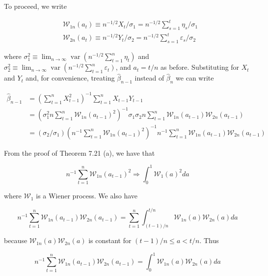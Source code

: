 \documentclass[10pt]{article}
\begin{document}
To proceed, we write

$$
\begin{aligned}
& \mathcal{W}_{1 n}\left(a_{t}\right) \equiv n^{-1 / 2} X_{t} / \sigma_{1}=n^{-1 / 2} \sum_{s=1}^{t} \eta_{s} / \sigma_{1} \\
& \mathcal{W}_{2 n}\left(a_{t}\right) \equiv n^{-1 / 2} Y_{t} / \sigma_{2}=n^{-1 / 2} \sum_{s=1}^{t} \varepsilon_{s} / \sigma_{2}
\end{aligned}
$$

where $\sigma_{1}^{2} \equiv \lim _{n \rightarrow \infty} \operatorname{var}\left(n^{-1 / 2} \sum_{t=1}^{n} \eta_{t}\right)$ and $\sigma_{2}^{2} \equiv \lim _{n \rightarrow \infty} \operatorname{var}\left(n^{-1 / 2} \sum_{t=1}^{n}\right. \left.\varepsilon_{t}\right)$, and $a_{t}=t / n$ as before. Substituting for $X_{t}$ and $Y_{t}$ and, for convenience, treating $\hat{\beta}_{n-1}$ instead of $\hat{\beta}_{n}$ we can write

$$
\begin{aligned}
\hat{\beta}_{n-1} & =\left(\sum_{t=1}^{n} X_{t-1}^{2}\right)^{-1} \sum_{t=1}^{n} X_{t-1} Y_{t-1} \\
& =\left(\sigma_{1}^{2} n \sum_{t=1}^{n} \mathcal{W}_{1 n}\left(a_{t-1}\right)^{2}\right)^{-1} \sigma_{1} \sigma_{2} n \sum_{t=1}^{n} \mathcal{W}_{1 n}\left(a_{t-1}\right) \mathcal{W}_{2 n}\left(a_{t-1}\right) \\
& =\left(\sigma_{2} / \sigma_{1}\right)\left(n^{-1} \sum_{t=1}^{n} \mathcal{W}_{1 n}\left(a_{t-1}\right)^{2}\right)^{-1} n^{-1} \sum_{t=1}^{n} \mathcal{W}_{1 n}\left(a_{t-1}\right) \mathcal{W}_{2 n}\left(a_{t-1}\right)
\end{aligned}
$$

From the proof of Theorem 7.21 (a), we have that

$$
n^{-1} \sum_{t=1}^{n} \mathcal{W}_{1 n}\left(a_{t-1}\right)^{2} \Rightarrow \int_{0}^{1} \mathcal{W}_{1}(a)^{2} d a
$$

where $\mathcal{W}_{1}$ is a Wiener process. We also have

$$
n^{-1} \sum_{t=1}^{n} \mathcal{W}_{1 n}\left(a_{t-1}\right) \mathcal{W}_{2 n}\left(a_{t-1}\right)=\sum_{t=1}^{n} \int_{(t-1) / n}^{t / n} \mathcal{W}_{1 n}(a) \mathcal{W}_{2 n}(a) d a
$$

because $\mathcal{W}_{1 n}(a) \mathcal{W}_{2 n}(a)$ is constant for $(t-1) / n \leq a<t / n$. Thus

$$
n^{-1} \sum_{t=1}^{n} \mathcal{W}_{1 n}\left(a_{t-1}\right) \mathcal{W}_{2 n}\left(a_{t-1}\right)=\int_{0}^{1} \mathcal{W}_{1 n}(a) \mathcal{W}_{2 n}(a) d a
$$
\end{document}
